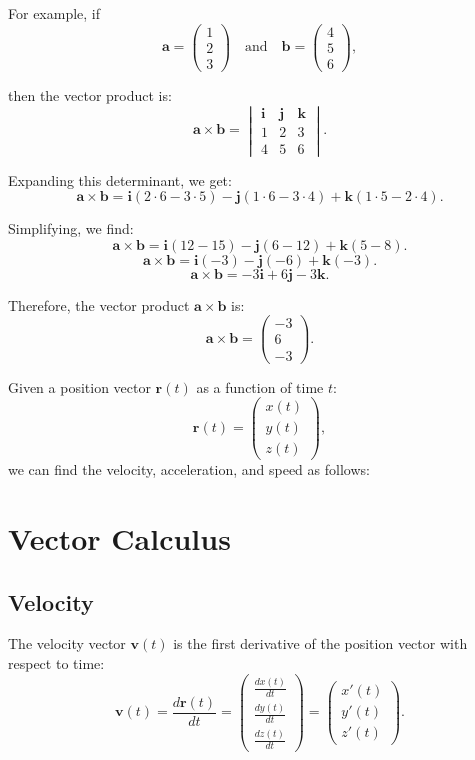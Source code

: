\documentclass[a4paper,12pt]{article}
\begin{document}
\begin{itemize}[leftmargin=*]
For example, if
\[
\mathbf{a} = \begin{pmatrix} 1 \\ 2 \\ 3 \end{pmatrix}
\quad \text{and} \quad
\mathbf{b} = \begin{pmatrix} 4 \\ 5 \\ 6 \end{pmatrix},
\]

then the vector product is:
\[
\mathbf{a} \times \mathbf{b} = \begin{vmatrix}
\mathbf{i} & \mathbf{j} & \mathbf{k} \\
1 & 2 & 3 \\
4 & 5 & 6
\end{vmatrix}.
\]

Expanding this determinant, we get:
\[
\mathbf{a} \times \mathbf{b} = \mathbf{i}(2 \cdot 6 - 3 \cdot 5) - \mathbf{j}(1 \cdot 6 - 3 \cdot 4) + \mathbf{k}(1 \cdot 5 - 2 \cdot 4).
\]

Simplifying, we find:
\[
\mathbf{a} \times \mathbf{b} = \mathbf{i}(12 - 15) - \mathbf{j}(6 - 12) + \mathbf{k}(5 - 8).
\]
\[
\mathbf{a} \times \mathbf{b} = \mathbf{i}(-3) - \mathbf{j}(-6) + \mathbf{k}(-3).
\]
\[
\mathbf{a} \times \mathbf{b} = -3\mathbf{i} + 6\mathbf{j} - 3\mathbf{k}.
\]

Therefore, the vector product \(\mathbf{a} \times \mathbf{b}\) is:
\[
\mathbf{a} \times \mathbf{b} = \begin{pmatrix} -3 \\ 6 \\ -3 \end{pmatrix}.
\]


Given a position vector \(\mathbf{r}(t)\) as a function of time \(t\):
\[
\mathbf{r}(t) = \begin{pmatrix} x(t) \\ y(t) \\ z(t) \end{pmatrix},
\]
we can find the velocity, acceleration, and speed as follows:
\section{Vector Calculus}
\subsection*{Velocity}

The velocity vector \(\mathbf{v}(t)\) is the first derivative of the position vector with respect to time:
\[
\mathbf{v}(t) = \frac{d\mathbf{r}(t)}{dt} = \begin{pmatrix} \frac{dx(t)}{dt} \\ \frac{dy(t)}{dt} \\ \frac{dz(t)}{dt} \end{pmatrix} = \begin{pmatrix} x'(t) \\ y'(t) \\ z'(t) \end{pmatrix}.
\]


\end{itemize}
\end{document}
